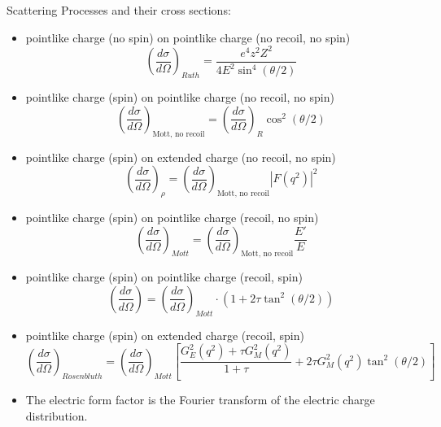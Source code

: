 \documentclass[a4paper, 11pt, normalem]{report}
\begin{document}
\chapter{}
Scattering Processes and their cross sections:
\begin{itemize}
    \item pointlike charge (no spin) on pointlike charge (no recoil, no spin) 
        \begin{equation}
            \left(\frac{d\sigma}{d\Omega}\right)_{Ruth} = \frac{e^4z^2Z^2}{4E^2\sin^4(\theta/2)}
        \end{equation}
    \item pointlike charge (spin) on pointlike charge (no recoil, no spin) 
        \begin{equation}
            \left(\frac{d\sigma}{d\Omega}\right)_{\text{Mott, no recoil}} = \left(\frac{d\sigma}{d\Omega}\right)_R \cos^2(\theta/2)
        \end{equation}
    \item pointlike charge (spin) on extended charge (no recoil, no spin) 
        \begin{equation}
            \left(\frac{d\sigma}{d\Omega}\right)_\rho = \left(\frac{d\sigma}{d\Omega}\right)_{\text{Mott, no recoil}} |F(q^2)|^2
        \end{equation}
    \item pointlike charge (spin) on pointlike charge (recoil, no spin) 
        \begin{equation}
            \left(\frac{d\sigma}{d\Omega}\right)_{Mott} = \left(\frac{d\sigma}{d\Omega}\right)_{\text{Mott, no recoil}} \frac{E'}{E}
        \end{equation}
    \item pointlike charge (spin) on pointlike charge (recoil, spin) 
        \begin{equation}
            \left(\frac{d\sigma}{d\Omega}\right) = \left(\frac{d\sigma}{d\Omega}\right)_{Mott} \cdot \left(1 + 2\tau\tan^2(\theta/2)\right)
        \end{equation}
    \item pointlike charge (spin) on extended charge (recoil, spin) 
        \begin{equation}
            \left(\frac{d\sigma}{d\Omega}\right)_{Rosenbluth} = \left(\frac{d\sigma}{d\Omega}\right)_{Mott}\left[\frac{G^2_E(q^2) + \tau G^2_M(q^2)}{1+\tau} + 2\tau G^2_M(q^2)\tan^2(\theta/2)\right]
        \end{equation}
    \item The electric form factor is the Fourier transform of the electric charge distribution. 

\end{itemize}
\end{document}
